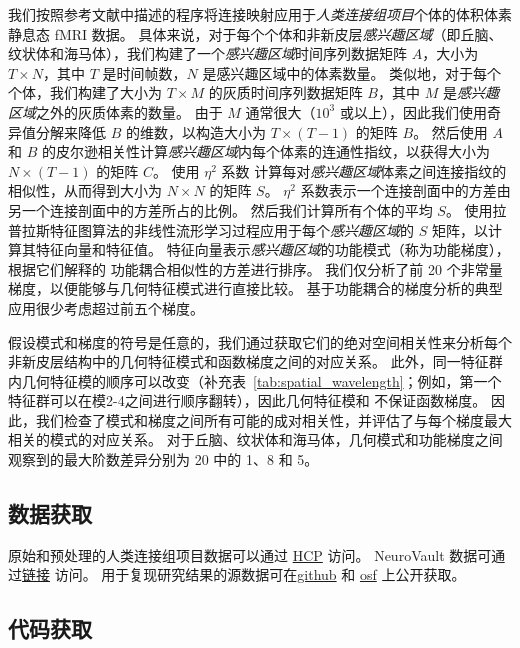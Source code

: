 \documentclass[lang=cn,a4paper,newtx,citestyle=gb7714-2015, bibstyle=gb7714-2015]{elegantpaper}
\begin{document}
我们按照参考文献中描述的程序将连接映射应用于\textit{人类连接组项目}个体的体积体素静息态 fMRI 数据\cite{haak2018connectopic}。
具体来说，对于每个个体和非新皮层\textit{感兴趣区域}（即丘脑、纹状体和海马体），我们构建了一个\textit{感兴趣区域}时间序列数据矩阵 $ A $，大小为 $ T \times N $，其中 $ T $ 是时间帧数，$ N $ 是感兴趣区域中的体素数量。
类似地，对于每个个体，我们构建了大小为 $ T \times M $ 的灰质时间序列数据矩阵 $ B $，其中 $ M $ 是\textit{感兴趣区域}之外的灰质体素的数量。
由于 $ M $ 通常很大（$ 10^3 $ 或以上），因此我们使用奇异值分解来降低 $ B $ 的维数，以构造大小为 $ T \times (T - 1) $ 的矩阵 $ B $。
然后使用 $ A $ 和 $ B $ 的皮尔逊相关性计算\textit{感兴趣区域}内每个体素的连通性指纹，以获得大小为 $ N \times (T - 1) $ 的矩阵 $ C $。
使用 $ \eta^2 $ 系数 \cite{alexander2018testing} 计算每对\textit{感兴趣区域}体素之间连接指纹的相似性，从而得到大小为 $ N \times N $ 的矩阵 $ S $。
$ \eta^2 $ 系数表示一个连接剖面中的方差由另一个连接剖面中的方差所占的比例。
然后我们计算所有个体的平均 $ S $。 
使用拉普拉斯特征图算法\cite{belkin2003laplacian}的非线性流形学习过程应用于每个\textit{感兴趣区域}的 $ S $ 矩阵，以计算其特征向量和特征值。
特征向量表示\textit{感兴趣区域}的功能模式（称为功能梯度），根据它们解释的 功能耦合相似性的方差进行排序。
我们仅分析了前 20 个非常量梯度，以便能够与几何特征模式进行直接比较。
基于功能耦合的梯度分析的典型应用很少考虑超过前五个梯度\cite{haak2018connectopic,margulies2016situating}。


假设模式和梯度的符号是任意的，我们通过获取它们的绝对空间相关性来分析每个非新皮层结构中的几何特征模式和函数梯度之间的对应关系。
此外，同一特征群内几何特征模的顺序可以改变（补充表~\ref{tab:spatial_wavelength}；例如，第一个特征群可以在模2-4之间进行顺序翻转），因此几何特征模和 不保证函数梯度。
因此，我们检查了模式和梯度之间所有可能的成对相关性，并评估了与每个梯度最大相关的模式的对应关系。
对于丘脑、纹状体和海马体，几何模式和功能梯度之间观察到的最大阶数差异分别为 20 中的 1、8 和 5。


\subsection{数据获取} \label{sec:data_availability}

原始和预处理的人类连接组项目数据可以通过 \href{https://db.human connectome.org/}{HCP} 访问。
NeuroVault 数据可通过\href{https://neurovault.org/}{链接} 访问。
用于复现研究结果的源数据可在\href{https://github.com/NSBLab/BrainEigenmodes}{github}  和 \href{https://osf.io/xczmp/}{osf} 上公开获取。

\subsection{代码获取} \label{sec:code_availability}
\end{document}
